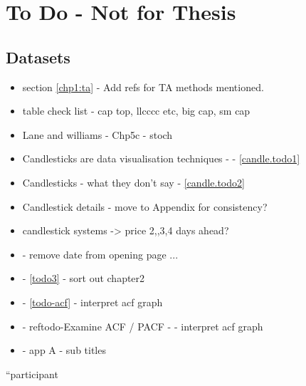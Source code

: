 
\chapter{To Do - Not for Thesis} %

\label{Chapter7} %



\section{Datasets}


\begin{itemize}
\item section \ref{chp1:ta} - Add refs for TA methods mentioned.
\item table check list - cap top, llcccc etc, big cap, sm cap
\item Lane \cite{lane1986using} and williams \cite{williams2011long} \cite{williams1989definitive} - Chp5c - stoch
\item Candlesticks are data visualisation techniques - - \ref{candle.todo1}
\item Candlesticks - what they don't say - \ref{candle.todo2}
\item Candlestick details - move to Appendix for consistency?
\item candlestick systems -> price 2,,3,4 days ahead?
\item - remove date from opening page ...
\item - \ref{todo3} - sort out chapter2
\item - \ref{todo-acf} - interpret acf graph
\item - ref{todo-Examine ACF / PACF} - - interpret acf graph
\item - app A - sub titles
\end{itemize}


\textquotedblleft participant